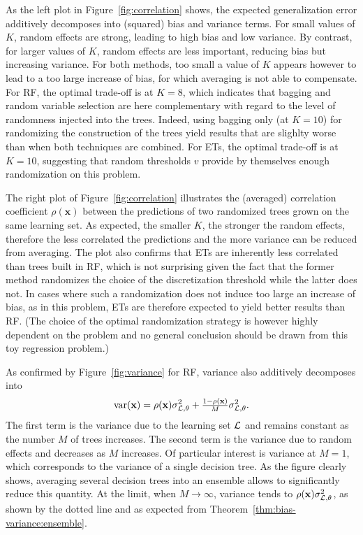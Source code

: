 As the left plot in Figure~\ref{fig:correlation} shows,  the expected
generalization error additively decomposes into (squared) bias and variance
terms.  For small values of $K$, random effects are strong, leading to high
bias and low variance. By contrast, for larger values of $K$, random effects
are less important, reducing bias but increasing variance.   For both methods,
too small a value of $K$ appears however to lead to a too large increase of
bias, for which averaging is not able to compensate. For RF, the optimal
trade-off is at $K=8$, which indicates that bagging and random variable selection are
here complementary with regard to the level of randomness injected into the
trees. Indeed, using bagging only (at $K=10$) for randomizing the construction
of the trees yield results that are slighlty worse than when both techniques
are combined. For ETs, the optimal trade-off is at $K=10$, suggesting that
random thresholds $v$ provide by themselves enough randomization on this
problem.

The right plot of Figure~\ref{fig:correlation} illustrates the (averaged)
correlation coefficient $\rho(\mathbf{x})$ between the predictions of two
randomized trees grown on the same learning set. As expected, the smaller $K$,
the stronger the random effects, therefore the less correlated the predictions
and the more variance can be reduced from averaging. The plot also confirms
that ETs are inherently less correlated than trees built
in RF, which is not surprising given the fact that the former
method randomizes the choice of the discretization threshold while the latter
does not. In cases where such a randomization does not induce too large an
increase of bias, as in this problem, ETs are therefore
expected to yield better results than RF.  (The choice of the
optimal randomization strategy is however highly dependent on the problem and
no general conclusion should be drawn from this toy regression problem.)

As confirmed by Figure~\ref{fig:variance} for RF, variance also additively decomposes  into
\begin{equation}
\text{var}(\mathbf{x}) = \rho(\mathbf{x}) \sigma^2_{{\cal L},\theta} + \tfrac{1 - \rho(\mathbf{x})}{M} \sigma^2_{{\cal L},\theta}.
\end{equation}
The first term is the variance due to the learning set ${\cal L}$ and remains
constant as the number $M$ of trees increases. The second term is the variance
due to random effects and decreases as $M$ increases. Of particular interest is
variance at $M=1$, which corresponds to the variance of a single decision tree.
As the figure clearly shows, averaging several decision trees into an ensemble
allows to significantly reduce this quantity. At the limit, when $M\to \infty$,
variance tends to $\rho(\mathbf{x}) \sigma^2_{{\cal L},\theta}$, as shown by
the dotted line and as expected from Theorem~\ref{thm:bias-variance:ensemble}.



